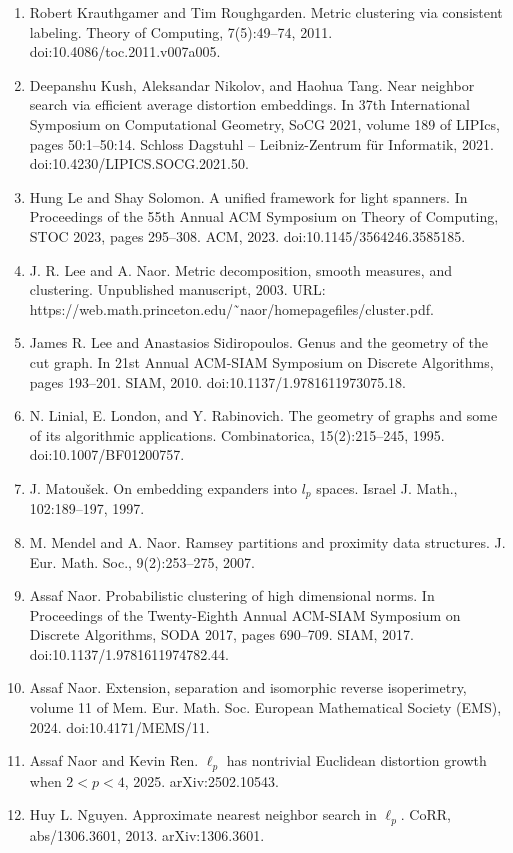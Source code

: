 \begin{enumerate}
\item[]  [32]  Robert Krauthgamer and Tim Roughgarden.  Metric clustering via consistent labeling.  Theory of Computing, 7(5):49–74, 2011.  doi:10.4086/toc.2011.v007a005.  
\item[]  [33]  Deepanshu Kush, Aleksandar Nikolov, and Haohua Tang.  Near neighbor search via efficient average distortion embeddings.  In 37th International Symposium on Computational Geometry, SoCG 2021, volume 189 of LIPIcs, pages 50:1–50:14. Schloss Dagstuhl – Leibniz-Zentrum für Informatik, 2021.  doi:10.4230/LIPICS.SOCG.2021.50.  
\item[]  [34]  Hung Le and Shay Solomon.  A unified framework for light spanners.  In Proceedings of the 55th Annual ACM Symposium on Theory of Computing, STOC 2023, pages 295–308. ACM, 2023.  doi:10.1145/3564246.3585185.  
\item[]  [35]  J. R. Lee and A. Naor.  Metric decomposition, smooth measures, and clustering.  Unpublished manuscript, 2003.  URL: https://web.math.princeton.edu/˜naor/homepagefiles/cluster.pdf.  
\item[]  [36]  James R. Lee and Anastasios Sidiropoulos.  Genus and the geometry of the cut graph.  In 21st Annual ACM-SIAM Symposium on Discrete Algorithms, pages 193–201. SIAM, 2010.  doi:10.1137/1.9781611973075.18.  
\item[]  [37]  N. Linial, E. London, and Y. Rabinovich.  The geometry of graphs and some of its algorithmic applications.  Combinatorica, 15(2):215–245, 1995.  doi:10.1007/BF01200757.  
\item[]  [38]  J. Matoušek.  On embedding expanders into $l_{p}$ spaces.  Israel J. Math., 102:189–197, 1997.  
\item[]  [39]  M. Mendel and A. Naor.  Ramsey partitions and proximity data structures.  J. Eur. Math. Soc., 9(2):253–275, 2007.  
\item[]  [40]  Assaf Naor.  Probabilistic clustering of high dimensional norms.  In Proceedings of the Twenty-Eighth Annual ACM-SIAM Symposium on Discrete Algorithms, SODA 2017, pages 690–709. SIAM, 2017.  doi:10.1137/1.9781611974782.44.  
\item[]  [41]  Assaf Naor.  Extension, separation and isomorphic reverse isoperimetry, volume 11 of Mem. Eur. Math. Soc.  European Mathematical Society (EMS), 2024.  doi:10.4171/MEMS/11.  
\item[]  [42]  Assaf Naor and Kevin Ren.  $\ell_{p}$ has nontrivial Euclidean distortion growth when $2<p<4$, 2025.  arXiv:2502.10543.  
\item[]  [43]  Huy L. Nguyen.  Approximate nearest neighbor search in $\ell_{p}$.  CoRR, abs/1306.3601, 2013.  arXiv:1306.3601.  

\end{enumerate}
